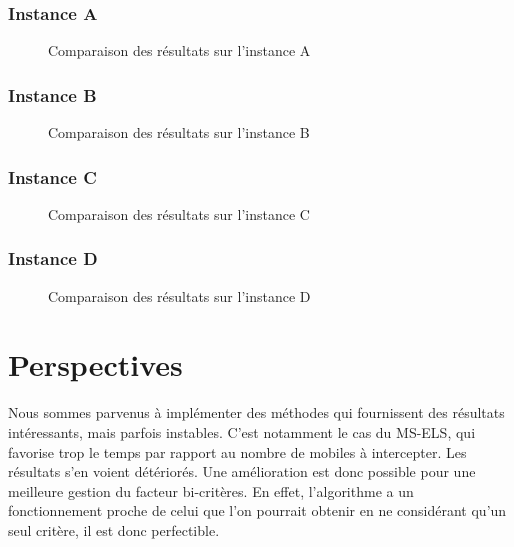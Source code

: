             \subsubsection{Instance A}
                \begin{figure}[H]
                    
                    \caption{Comparaison des résultats sur l'instance A}
                    \label{fig:10m2i2d-comp}
                \end{figure}

            \subsubsection{Instance B}
                \begin{figure}[H]
                    
                    \caption{Comparaison des résultats sur l'instance B}
                    \label{fig:20m3i3d-comp}
                \end{figure}

            \subsubsection{Instance C}
                \begin{figure}[H]
                    
                    \caption{Comparaison des résultats sur l'instance C}
                    \label{fig:30m4i3d-comp}
                \end{figure}

            \subsubsection{Instance D}
                \begin{figure}[H]
                    
                    \caption{Comparaison des résultats sur l'instance D}
                    \label{fig:40m5i4d-comp}
                \end{figure}
				
    \newpage
    \section{Perspectives}

        Nous sommes parvenus à implémenter des méthodes qui fournissent des résultats intéressants, mais parfois instables. C'est notamment le cas du MS-ELS, qui favorise trop le temps par rapport au nombre de mobiles à intercepter. Les résultats s'en voient détériorés. Une amélioration est donc possible pour une meilleure gestion du facteur bi-critères. En effet, l'algorithme a un fonctionnement proche de celui que l'on pourrait obtenir en ne considérant qu'un seul critère, il est donc perfectible.

